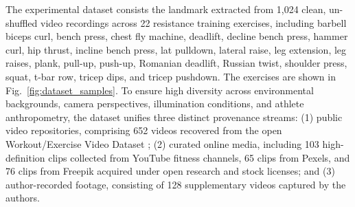 \documentclass[preprint,12pt]{elsarticle}
\newcommand{\rv}[1]{{\color{red}#1}}
\begin{document}
The experimental dataset consists the \rv{landmark extracted from} 1,024 clean, un-shuffled video recordings across 22 resistance training exercises, including barbell biceps curl, bench press, chest fly machine, deadlift, decline bench press, hammer curl, hip thrust, incline bench press, lat pulldown, lateral raise, leg extension, leg raises, plank, pull-up, push-up, Romanian deadlift, Russian twist, shoulder press, squat, t-bar row, tricep dips, and tricep pushdown.
The exercises are shown in Fig.~\ref{fig:dataset_samples}. 
To ensure high diversity across environmental backgrounds, camera perspectives, illumination conditions, and athlete anthropometry, the dataset unifies three distinct provenance streams: 
(1) public video repositories, comprising 652 videos recovered from the open Workout/Exercise Video Dataset \cite{abdillah2023}; 
(2) curated online media, including 103 high-definition clips collected from YouTube fitness channels, 65 clips from Pexels, and 76 clips from Freepik acquired under open research and stock licenses; 
and (3) author-recorded footage, consisting of 128 supplementary videos captured by the authors. %
\end{document}
